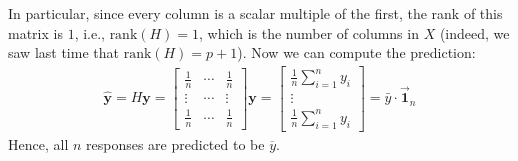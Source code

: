 \documentclass[12pt, a4paper]{article}
\theoremstyle{definition}
\begin{document}
	In particular, since every column is a scalar multiple of the first, the rank
	of this matrix is $1$, i.e., $\text{rank}(H)=1$, which is the number of columns
	in $X$ (indeed, we saw last time that $\text{rank}(H)=p+1$). Now we can
	compute the prediction:
	\begin{align*}
		\hat{\mathbf{y}} = H\mathbf{y}
		=\begin{bmatrix}
			\frac{1}{n} & \cdots & \frac{1}{n}\\
			\vdots & \cdots & \vdots\\
			\frac{1}{n} & \cdots & \frac{1}{n}
		\end{bmatrix}\mathbf{y}
		=\begin{bmatrix}
			\frac{1}{n}\sum_{i=1}^{n}y_i\\
			\vdots\\
			\frac{1}{n}\sum_{i=1}^{n}y_i
		\end{bmatrix}
		=\bar{y}\cdot  \vec{\mathbf{1}}_n
	\end{align*}
	Hence, all $n$ responses are predicted to be $\overline{y}$.
\end{document}
